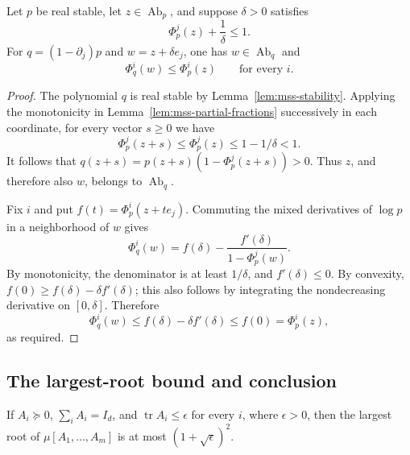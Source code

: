 \begin{lemma}
\label{lem:mss-barrier-shift}
Let $p$ be real stable, let $z\in\operatorname{Ab}_p$, and suppose
$\delta>0$ satisfies
\begin{equation}
 \Phi_p^j(z)+\frac1\delta\leq1.
 \label{eq:mss-shift-hypothesis}
\end{equation}
For $q=(1-\partial_j)p$ and $w=z+\delta e_j$, one has
$w\in\operatorname{Ab}_q$ and
\begin{equation}
 \Phi_q^i(w)\leq\Phi_p^i(z)\qquad\text{for every }i.
 \label{eq:mss-shift-conclusion}
\end{equation}
\end{lemma}

\begin{proof}
The polynomial $q$ is real stable by
Lemma~\ref{lem:mss-stability}.  Applying the monotonicity in
Lemma~\ref{lem:mss-partial-fractions} successively in each coordinate,
for every vector $s\geq0$ we have
\[
 \Phi_p^j(z+s)\leq\Phi_p^j(z)\leq1-1/\delta<1.
\]
It follows that
$q(z+s)=p(z+s)(1-\Phi_p^j(z+s))>0$.
Thus $z$, and therefore also $w$, belongs to $\operatorname{Ab}_q$.

Fix $i$ and put $f(t)=\Phi_p^i(z+te_j)$.
Commuting the mixed derivatives of $\log p$ in a neighborhood of
$w$ gives
\[
 \Phi_q^i(w)
 =f(\delta)-\frac{f'(\delta)}{1-\Phi_p^j(w)}.
\]
By monotonicity, the denominator is at least $1/\delta$, and
$f'(\delta)\leq0$.  By convexity,
$f(0)\geq f(\delta)-\delta f'(\delta)$; this also follows by
integrating the nondecreasing derivative on $[0,\delta]$.
Therefore
\[
 \Phi_q^i(w)
 \leq f(\delta)-\delta f'(\delta)
 \leq f(0)=\Phi_p^i(z),
\]
as required.
\end{proof}

\subsection{The largest-root bound and conclusion}

\begin{lemma}
\label{lem:mss-root-bound}
If $A_i\succeq0$, $\sum_iA_i=I_d$, and
$\operatorname{tr}A_i\leq\epsilon$ for every $i$, where $\epsilon>0$,
then the largest root of $\mu[A_1,\ldots,A_m]$ is at most
$(1+\sqrt\epsilon)^2$.
\end{lemma}

